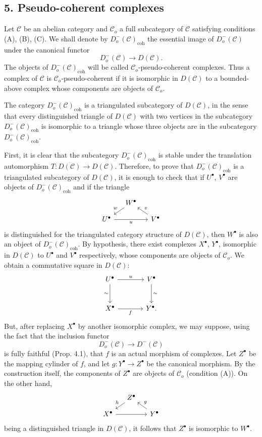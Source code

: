 \documentclass[11pt]{article}
\providecommand{\coh}{\mathrm{coh}}
\providecommand{\cC}{\mathcal C}
\providecommand{\cC}{\mathcal C}
\providecommand{\coh}{\mathrm{coh}}
\begin{document}
\subsection*{5. Pseudo-coherent complexes}

Let $\cC$ be an abelian category and $\cC_o$ a full subcategory of $\cC$ satisfying conditions (A), (B), (C). We shall denote by $D_o^-(\cC)_{\coh}$ the essential image of $D_o^-(\cC)$ under the canonical functor
\[
D_o^-(\cC)\longrightarrow D(\cC).
\]
The objects of $D_o^-(\cC)_{\coh}$ will be called $\cC_o$-pseudo-coherent complexes. Thus a complex of $\cC$ is $\cC_o$-pseudo-coherent if it is isomorphic in $D(\cC)$ to a bounded-above complex whose components are objects of $\cC_o$.

The category $D_o^-(\cC)_{\coh}$ is a triangulated subcategory of $D(\cC)$, in the sense that every distinguished triangle of $D(\cC)$ with two vertices in the subcategory $D_o^-(\cC)_{\coh}$ is isomorphic to a triangle whose three objects are in the subcategory $D_o^-(\cC)_{\coh}$.

First, it is clear that the subcategory $D_o^-(\cC)_{\coh}$ is stable under the translation automorphism $T:D(\cC)\to D(\cC)$. Therefore, to prove that $D_o^-(\cC)_{\coh}$ is a triangulated subcategory of $D(\cC)$, it is enough to check that if $U^\bullet$, $V^\bullet$ are objects of $D_o^-(\cC)_{\coh}$ and if the triangle
\[
\begin{tikzcd}[column sep=small,row sep=small]
& W^\bullet \arrow[dl,"w"']\\
U^\bullet \arrow[rr,"u"']&& V^\bullet \arrow[ul,"v"']
\end{tikzcd}
\]
is distinguished for the triangulated category structure of $D(\cC)$, then $W^\bullet$ is also an object of $D_o^-(\cC)_{\coh}$. By hypothesis, there exist complexes $X^\bullet$, $Y^\bullet$, isomorphic in $D(\cC)$ to $U^\bullet$ and $V^\bullet$ respectively, whose components are objects of $\cC_o$. We obtain a commutative square in $D(\cC)$:
\[
\begin{tikzcd}[column sep=large,row sep=large]
U^\bullet \arrow[r,"u"] \arrow[d,"\sim"']&V^\bullet \arrow[d,"\sim"]\\
X^\bullet \arrow[r,"f"']&Y^\bullet .
\end{tikzcd}
\]
But, after replacing $X^\bullet$ by another isomorphic complex, we may suppose, using the fact that the inclusion functor
\[
D_o^-(\cC)\longrightarrow D^-(\cC)
\]
is fully faithful (Prop. 4.1), that $f$ is an actual morphism of complexes. Let $Z^\bullet$ be the mapping cylinder of $f$, and let $g:Y^\bullet\to Z^\bullet$ be the canonical morphism. By the construction itself, the components of $Z^\bullet$ are objects of $\cC_o$ (condition (A)). On the other hand,
\[
\begin{tikzcd}[column sep=small,row sep=small]
&Z^\bullet \arrow[dl,"h"']\\
X^\bullet \arrow[rr]&&Y^\bullet \arrow[ul,"g"']
\end{tikzcd}
\]
being a distinguished triangle in $D(\cC)$, it follows that $Z^\bullet$ is isomorphic to $W^\bullet$.
\end{document}

